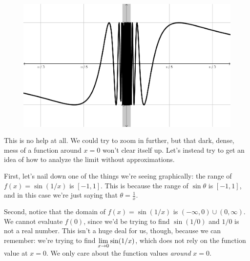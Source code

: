 \begin{figure}[h!tb]
  \includegraphics[scale=1]{./1_limits/images/1-1_graph5.png}
  \centering
\end{figure}

This is no help at all. We could try to zoom in further, but that dark, dense, mess of a function around $x=0$ won't clear itself up. Let's instead try to get an idea of how to analyze the limit without approximations.

First, let's nail down one of the things we're seeing graphically: the range of $f(x) = \sin(1/x)$ is $[-1,1]$.
This is because the range of $\sin\theta$ is $[-1,1]$, and in this case we're just saying that $\theta = \frac{1}{x}$.

Second, notice that the domain of $f(x) = \sin(1/x)$ is $(-\infty,0)\cup(0,\infty)$. We cannot evaluate $f(0)$, since we'd be trying to find $\sin(1/0)$ and $1/0$ is not a real number.
This isn't a huge deal for us, though, because we can remember: we're trying to find $\displaystyle \lim_{x\to0} \sin(1/x)$, which does not rely on the function value at $x=0$.
We only care about the function values \textit{around} $x=0$.
